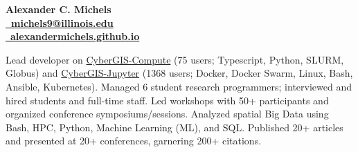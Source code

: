 \documentclass{acmresume}
\begin{document}
	
	\begin{multicols}{2}
		\textbf{\huge Alexander C. Michels}\\ \columnbreak
        \hfill\href{mailto:michels9@illinois.edu}{\textbf{\faEnvelope~michels9@illinois.edu}} \\
        \hfill\href{http://alexandermichels.github.io}{\faGlobeAmericas~\textbf{alexandermichels.github.io}} \\
	\end{multicols}
    \vspace*{-.25cm}



	
	
		
		
	
	
        \begin{titemize}
            \titem Lead developer on \href{https://github.com/cybergis/cybergis-compute-python-sdk}{CyberGIS-Compute} (75 users; Typescript, Python, SLURM, Globus) and \href{https://cybergisx.cigi.illinois.edu/}{CyberGIS-Jupyter} (1368 users; Docker, Docker Swarm, Linux, Bash, Ansible, Kubernetes).
            \titem Managed 6 student research programmers; interviewed and hired students and full-time staff.
            \titem Led workshops with 50+ participants and organized conference symposiums/sessions.
            \titem Analyzed spatial Big Data using Bash, HPC, Python, Machine Learning (ML), and SQL.
            \titem Published 20+ articles and presented at 20+ conferences, garnering 200+ citations.
        \end{titemize}
\end{document}
